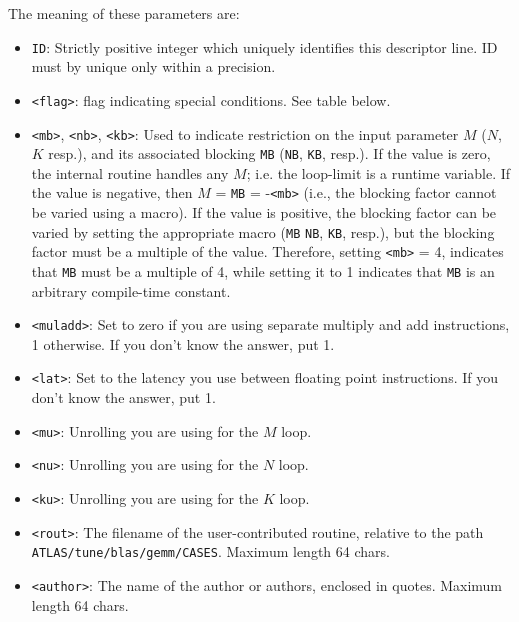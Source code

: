 \documentclass[11pt]{article}
\begin{document}
The meaning of these parameters are:
\begin{itemize}
\item {\verb+ID+}: Strictly positive integer which uniquely identifies this
descriptor line.  ID must by unique only within a precision.
\item {\verb+<flag>+}: flag indicating special conditions.  See table below.

\item{\verb+<mb>+, \verb+<nb>+, \verb+<kb>+}: 
   Used to indicate restriction on the input parameter $M$ ($N$, $K$ resp.),
   and its associated blocking {\tt MB} ({\tt NB}, {\tt KB}, resp.).
   If the value is zero, the internal routine handles any $M$; i.e.
   the loop-limit is a runtime variable.  If the value is negative, then
   $M$ = {\tt MB} = -\verb+<mb>+ (i.e., the blocking factor cannot be
   varied using a macro).  If the value is positive, the blocking factor
   can be varied by setting the appropriate macro 
   ({\tt MB} {\tt NB}, {\tt KB}, resp.), but the blocking factor must be
   a multiple of the value.  Therefore, setting \verb+<mb>+ = 4, indicates
   that {\tt MB} must be a multiple of 4, while setting it to 1 indicates
   that {\tt MB} is an arbitrary compile-time constant.
\item{\verb+<muladd>+}:
   Set to zero if you are using separate multiply and add instructions, 1
   otherwise.  If you don't know the answer, put 1.
\item{\verb+<lat>+}:
   Set to the latency you use between floating point instructions.
   If you don't know the answer, put 1.
\item{\verb+<mu>+}:
   Unrolling you are using for the $M$ loop.
\item{\verb+<nu>+}:
   Unrolling you are using for the $N$ loop.
\item{\verb+<ku>+}:
   Unrolling you are using for the $K$ loop.
\item{\verb+<rout>+}:
   The filename of the user-contributed routine, relative to the path
   {\tt ATLAS/tune/blas/gemm/CASES}.  Maximum length 64 chars.
\item{\verb+<author>+}:
   The name of the author or authors, enclosed in quotes.  
   Maximum length 64 chars.
\end{itemize}
\end{document}
